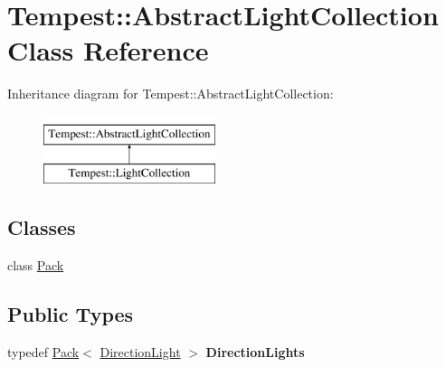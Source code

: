\hypertarget{class_tempest_1_1_abstract_light_collection}{\section{Tempest\+:\+:Abstract\+Light\+Collection Class Reference}
\label{class_tempest_1_1_abstract_light_collection}
}
Inheritance diagram for Tempest\+:\+:Abstract\+Light\+Collection\+:\begin{figure}[H]
\begin{center}
\leavevmode
\includegraphics[height=2.000000cm]{class_tempest_1_1_abstract_light_collection}
\end{center}
\end{figure}
\subsection*{Classes}
\begin{DoxyCompactItemize}
\item 
class \hyperlink{class_tempest_1_1_abstract_light_collection_1_1_pack}{Pack}
\end{DoxyCompactItemize}
\subsection*{Public Types}
\begin{DoxyCompactItemize}
\item 
\hypertarget{class_tempest_1_1_abstract_light_collection_a2291e4a1d1006cb1d05069e09166a50e}{typedef \hyperlink{class_tempest_1_1_abstract_light_collection_1_1_pack}{Pack}$<$ \hyperlink{class_tempest_1_1_direction_light}{Direction\+Light} $>$ {\bfseries Direction\+Lights}}\label{class_tempest_1_1_abstract_light_collection_a2291e4a1d1006cb1d05069e09166a50e}

\end{DoxyCompactItemize}

